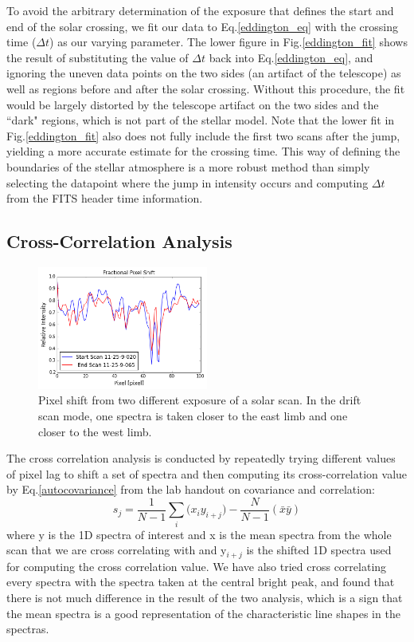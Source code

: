 \documentclass[authoryear, 12pt,5p, times]{elsarticle}
\begin{document}
To avoid the arbitrary determination of the exposure that defines the start and end of the solar crossing, we fit our data to Eq.\ref{eddington_eq} with the crossing time ($\Delta t$) as our varying parameter.  The lower figure in Fig.\ref{eddington_fit} shows the result of substituting the value of $\Delta t$ back into Eq.\ref{eddington_eq}, and ignoring the uneven data points on the two sides  (an artifact of the telescope) as well as regions before and after the solar crossing. Without this procedure, the fit would be largely distorted by the telescope artifact on the two sides and the ``dark" regions, which is not part of the stellar model.  Note that the lower fit in Fig.\ref{eddington_fit} also does not fully include the first two scans after the jump, yielding a more accurate estimate for the crossing time. This way of defining the boundaries of the stellar atmosphere is a more robust method than simply selecting the datapoint where the jump in intensity occurs and computing $\Delta t$ from the FITS header time information.


\subsection{Cross-Correlation Analysis}
\begin{figure}[h!]
\includegraphics[width=0.5\textwidth]{figures/pix_shift}
\caption{Pixel shift from two different exposure of a solar scan. In the drift scan mode, one spectra is taken closer to the east limb and one closer to the west limb.}
\label{pix_shift}
\end{figure}
The cross correlation analysis is conducted by repeatedly trying different values of pixel lag to shift a set of spectra and then computing its cross-correlation value by  Eq.\ref{autocovariance} from the lab handout on covariance and correlation: 
\begin{equation}
s_j = \frac{1}{N-1}\sum\limits_i \Big(x_i y_{i+j}\Big)-\frac{N}{N-1}(\bar{x}\bar{y})
\label{autocovariance}
\end{equation}
where y is the 1D spectra of interest and x is the mean spectra from the whole scan that we are cross correlating with and y$_{i+j}$ is the shifted 1D spectra used for computing the cross correlation value. We have also tried cross correlating every spectra with the spectra taken at the central bright peak, and found that there is not much difference in the result of the two analysis, which is a sign that the mean spectra is a good representation of the characteristic line shapes in the spectras.
\end{document}
